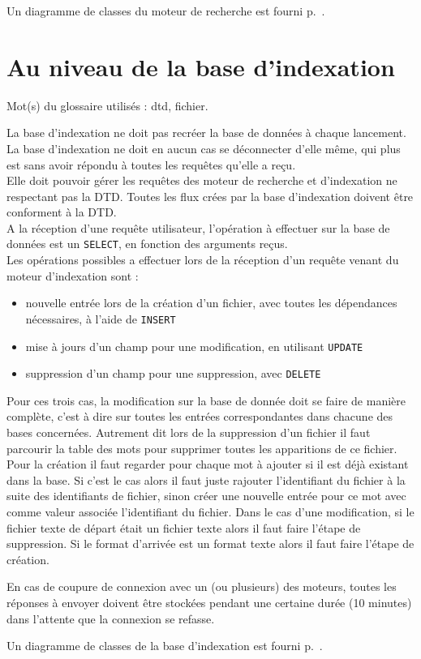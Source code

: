 Un diagramme de classes du moteur de recherche est fourni p.~\pageref{diagramme_classes_mr}.

\newpage

\section{Au niveau de la base d'indexation}
Mot(s) du glossaire utilisés : \gls{dtd}, \gls{fichier}.

La base d'indexation ne doit pas recréer la base de données à chaque lancement.\\
La base d'indexation ne doit en aucun cas se déconnecter d'elle même, qui plus est sans avoir répondu à toutes les requêtes qu'elle a reçu.\\
Elle doit pouvoir gérer les requêtes des moteur de recherche et d'indexation ne respectant pas la DTD. Toutes les flux crées par la base d'indexation doivent être conforment à la DTD.\\
A la réception d'une requête utilisateur, l'opération à effectuer sur la base de données est un \verb"SELECT", en fonction des arguments reçus.\\
Les opérations possibles a effectuer lors de la réception d'un requête venant du moteur d'indexation sont :
\begin{itemize}
\item nouvelle entrée lors de la création d'un fichier, avec toutes les dépendances nécessaires, à l'aide de \verb"INSERT"
\item mise à jours d'un champ pour une modification, en utilisant \verb"UPDATE"
\item suppression d'un champ pour une suppression, avec \verb"DELETE"
\end{itemize}
Pour ces trois cas, la modification sur la base de donnée doit se faire de manière complète, c'est à dire sur toutes les entrées correspondantes dans chacune des bases concernées. Autrement dit lors de la suppression d'un fichier il faut parcourir la table des mots pour supprimer toutes les apparitions de ce fichier. Pour la création il faut regarder pour chaque mot à ajouter si il est déjà existant dans la base. Si c'est le cas alors il faut juste rajouter l'identifiant du fichier à la suite des identifiants de fichier, sinon créer une nouvelle entrée pour ce mot avec comme valeur associée l'identifiant du fichier. Dans le cas d'une modification, si le fichier texte de départ était un fichier texte alors il faut faire l'étape de suppression. Si le format d'arrivée est un format texte alors il faut faire l'étape de création.

En cas de coupure de connexion avec un (ou plusieurs) des moteurs, toutes les réponses à envoyer doivent être stockées pendant une certaine durée (10 minutes) dans l'attente que la connexion se refasse.

Un diagramme de classes de la base d'indexation est fourni p.~\pageref{diagramme_classes_bi}.